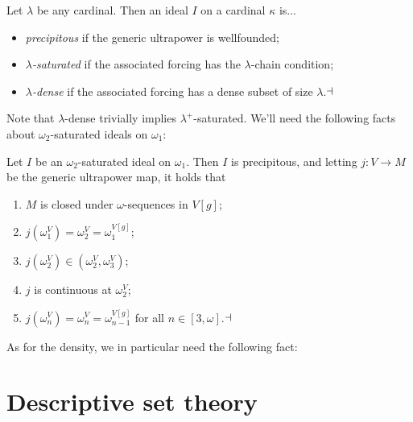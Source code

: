 \documentclass[../main]{subfiles}
\begin{document}
\begin{definition}
  Let $\lambda$ be any cardinal. Then an ideal $I$ on a cardinal
  $\kappa$ is...
  \begin{itemize}
  \item {} \emph{precipitous} if the generic
    ultrapower is wellfounded;
  \item {} \emph{$\lambda$-saturated}
    if the associated forcing has the $\lambda$-chain condition;
  \item {} \emph{$\lambda$-dense} if the
    associated forcing has a dense subset of size
    $\lambda$.$\hfill\dashv$
  \end{itemize}
\end{definition}

Note that $\lambda$-dense trivially implies
$\lambda^+$-saturated. We'll need the following facts about
$\omega_2$-saturated ideals on $\omega_1$:

\begin{proposition}
  \label{prop.ideal}
  Let $I$ be an $\omega_2$-saturated ideal on $\omega_1$. Then $I$ is
  precipitous, and letting $j \colon V\to M$ be the generic ultrapower map,
  it holds that
  \begin{enumerate}
    \item $M$ is closed under $\omega$-sequences in $V[g]$;
    \item $j(\omega_1^V)=\omega_2^V=\omega_1^{V[g]}$;
    \item $j(\omega_2^V)\in(\omega_2^V,\omega_3^V)$;
    \item $j$ is continuous at $\omega_2^V$;
    \item $j(\omega_n^V)=\omega_n^V=\omega_{n-1}^{V[g]}$ for all
      $n\in[3,\omega]$.$\hfill\dashv$
  \end{enumerate}
\end{proposition}

As for the density, we in particular need the following fact:




\section{Descriptive set theory}
\end{document}
